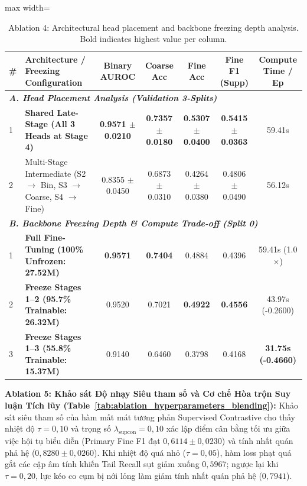 \documentclass[runningheads]{llncs}
\begin{document}
\begin{table}[t]
\centering
\caption{Ablation 4: Architectural head placement and backbone freezing depth analysis. Bold indicates highest value per column.}
\label{tab:ablation_placement_freezing}
\begin{adjustbox}{max width=\textwidth}
\begin{tabular}{llccccc}
\toprule
\textbf{\#} & \textbf{Architecture / Freezing Configuration} & \textbf{Binary AUROC} & \textbf{Coarse Acc} & \textbf{Fine Acc} & \textbf{Fine F1 (Supp)} & \textbf{Compute Time / Ep} \\
\midrule
\multicolumn{7}{l}{\textit{\textbf{A. Head Placement Analysis (Validation 3-Splits)}}} \\
1 & \textbf{Shared Late-Stage (All 3 Heads at Stage 4)} & \textbf{0.9571 $\pm$ 0.0210} & \textbf{0.7357 $\pm$ 0.0180} & \textbf{0.5307 $\pm$ 0.0400} & \textbf{0.5415 $\pm$ 0.0363} & 59.41s \\
2 & Multi-Stage Intermediate (S2 $\to$ Bin, S3 $\to$ Coarse, S4 $\to$ Fine) & 0.8355 $\pm$ 0.0450 & 0.6873 $\pm$ 0.0310 & 0.4264 $\pm$ 0.0380 & 0.4806 $\pm$ 0.0490 & 56.12s \\
\midrule
\multicolumn{7}{l}{\textit{\textbf{B. Backbone Freezing Depth \& Compute Trade-off (Split 0)}}} \\
1 & \textbf{Full Fine-Tuning (100\% Unfrozen: 27.52M)} & \textbf{0.9571} & \textbf{0.7404} & 0.4884 & 0.4396 & 59.41s (1.0$\times$) \\
2 & \textbf{Freeze Stages 1--2 (95.7\% Trainable: 26.32M)} & 0.9520 & 0.7021 & \textbf{0.4922} & \textbf{0.4556} & 43.97s (-0.2600) \\
3 & \textbf{Freeze Stages 1--3 (55.8\% Trainable: 15.37M)} & 0.9140 & 0.6460 & 0.3798 & 0.4168 & \textbf{31.75s (-0.4660)} \\
\bottomrule
\end{tabular}
\end{adjustbox}
\end{table}

\noindent \textbf{Ablation 5: Khảo sát Độ nhạy Siêu tham số và Cơ chế Hòa trộn Suy luận Tích lũy (Table~\ref{tab:ablation_hyperparameters_blending}):} 
Khảo sát siêu tham số của hàm mất mát tương phản Supervised Contrastive cho thấy nhiệt độ $\tau = 0{,}10$ và trọng số $\lambda_{\text{supcon}} = 0{,}10$ xác lập điểm cân bằng tối ưu giữa việc hội tụ biểu diễn (Primary Fine F1 đạt $0{,}6114 \pm 0{,}0230$) và tính nhất quán phả hệ ($0{,}8280 \pm 0{,}0260$). Khi nhiệt độ quá nhỏ ($\tau=0{,}05$), hàm loss phạt quá gắt các cặp âm tính khiến Tail Recall sụt giảm xuống $0{,}5967$; ngược lại khi $\tau=0{,}20$, lực kéo co cụm bị nới lỏng làm giảm tính nhất quán phả hệ ($0{,}7941$).
\end{document}
